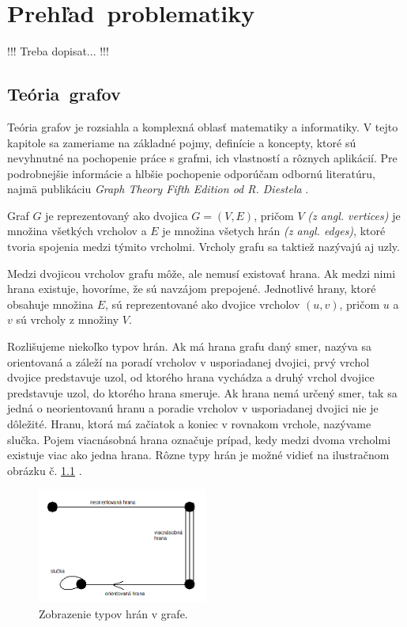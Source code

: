 \chapter{Prehľad~problematiky}\label{ch:terminology}

!!! Treba dopisat... !!!

\section{Teória~grafov}\label{sec:graph-theory}

Teória grafov je rozsiahla a komplexná oblasť matematiky a informatiky. V tejto kapitole sa zameriame na základné 
pojmy, definície a koncepty, ktoré sú nevyhnutné na pochopenie práce s grafmi, ich vlastností a rôznych aplikácií. 
Pre podrobnejšie informácie a hlbšie pochopenie odporúčam odbornú literatúru, najmä publikáciu
\textit{Graph Theory Fifth Edition od R. Diestela} \cite{diestel2017graph} .

Graf $G$ je reprezentovaný ako dvojica $G = (V, E)$, pričom $V$ \textit{(z angl. vertices)} je množina všetkých
vrcholov a $E$ je množina všetych hrán \textit{(z angl. edges)}, ktoré tvoria spojenia medzi týmito vrcholmi.
Vrcholy grafu sa taktiež nazývajú aj uzly.

Medzi dvojicou vrcholov grafu môže, ale nemusí existovať hrana. Ak medzi nimi hrana existuje, hovoríme, že sú
navzájom prepojené. Jednotlivé hrany, ktoré obsahuje množina $E$, sú reprezentované ako dvojice vrcholov $(u, v)$, 
pričom $u$ a $v$ sú vrcholy z množiny $V$. 

Rozlišujeme niekoľko typov hrán. Ak má hrana grafu daný smer, nazýva sa orientovaná a záleží
na poradí vrcholov v usporiadanej dvojici, prvý vrchol dvojice predstavuje uzol, od ktorého hrana vychádza a 
druhý vrchol dvojice predstavuje uzol, do ktorého hrana smeruje. Ak hrana nemá určený smer, tak sa jedná o 
neorientovanú hranu a poradie vrcholov v usporiadanej dvojici nie je dôležité. Hranu, ktorá má začiatok a koniec 
v rovnakom vrchole, nazývame slučka. Pojem viacnásobná hrana označuje prípad, kedy medzi dvoma vrcholmi existuje viac ako jedna hrana. 
Rôzne typy hrán je možné vidieť na ilustračnom obrázku č. \ref{obr:edges} .

\begin{figure}
    \centerline{\includegraphics[width=0.5\textwidth]{images/edges.png}}
    \caption[Zobrazenie typov hrán v grafe.]{Zobrazenie typov hrán v grafe.}
    \label{obr:edges}
\end{figure}


